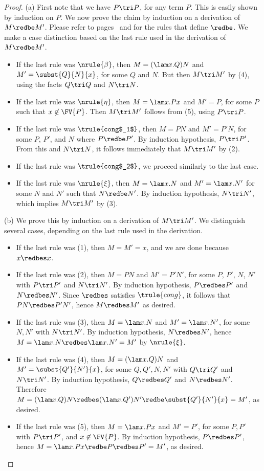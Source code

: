 \documentclass[12pt]{article}
\begin{document}
\begin{proof}
  (a) First note that we have $P\tri P$, for any term $P$. This is
  easily shown by induction on $P$. We now prove the claim by
  induction on a derivation of $M\redbe M'$.  Please refer to
  pages~\pageref{page-def-beta} and {\pageref{page-def-eta}} for
  the rules that define $\redbe$. We make a case distinction based on
  the last rule used in the derivation of $M\redbe M'$.
  \begin{itemize}
  \item If the last rule was $\nrule{\beta}$, then $M=(\lam x.Q)N$ and
    $M'=\subst{Q}{N}{x}$, for some $Q$ and $N$. But then $M\tri M'$ by 
    (4), using the facts $Q\tri Q$ and $N\tri N$. 
  \item If the last rule was $\nrule{\eta}$, then $M=\lam x.Px$ and
    $M'=P$, for some $P$ such that $x\not\in\FV{P}$. Then $M\tri M'$
    follows from (5), using $P\tri P$.
  \item If the last rule was $\trule{cong$_1$}$, then $M=PN$ and
    $M'=P'N$, for some $P$, $P'$, and $N$ where $P\redbe P'$. By
    induction hypothesis, $P\tri P'$. From this and $N\tri N$, it
    follows immediately that $M\tri M'$ by (2).
  \item If the last rule was $\trule{cong$_2$}$, we proceed similarly
    to the last case.
  \item If the last rule was $\nrule{\xi}$, then $M=\lam x.N$ and
    $M'=\lam x.N'$ for some $N$ and $N'$ such that $N\redbe N'$. By
    induction hypothesis, $N\tri N'$, which implies $M\tri M'$ by (3).
  \end{itemize}
  
  (b) We prove this by induction on a derivation of $M\tri M'$. We
  distinguish several cases, depending on the last rule used in the
  derivation.
  \begin{itemize}
  \item If the last rule was (1), then $M=M'=x$, and we are done because
    $x\redbes x$.
  \item If the last rule was (2), then $M=PN$ and $M'=P'N'$, for some
    $P$, $P'$, $N$, $N'$ with $P\tri P'$ and $N\tri N'$. By induction
    hypothesis, $P\redbes P'$ and $N\redbes N'$. Since $\redbes$
    satisfies $\trule{cong}$, it follows that $PN\redbes P'N'$, hence
    $M\redbes M'$ as desired.
  \item If the last rule was (3), then $M=\lam x.N$ and $M'=\lam
    x.N'$, for some $N,N'$ with $N\tri N'$. By induction hypothesis,
    $N\redbes N'$, hence $M=\lam x.N\redbes \lam x.N'=M'$ by
    $\nrule{\xi}$. 
  \item If the last rule was (4), then $M=(\lam x.Q)N$ and
    $M'=\subst{Q'}{N'}{x}$, for some $Q,Q',N,N'$ with $Q\tri Q'$ and
    $N\tri N'$. By induction hypothesis, $Q\redbes Q'$ and $N\redbes
    N'$. Therefore $M=(\lam x.Q)N\redbes(\lam x.Q')N'\redbe
    \subst{Q'}{N'}{x}=M'$, as desired.
  \item If the last rule was (5), then $M=\lam x.Px$ and $M'=P'$, for
    some $P,P'$ with $P\tri P'$, and $x\not\in\FV{P}$. By induction
    hypothesis, $P\redbes P'$, hence $M=\lam x.Px\redbe P\redbes
    P'=M'$, as desired.
  \end{itemize}
  

\end{proof}
\end{document}
